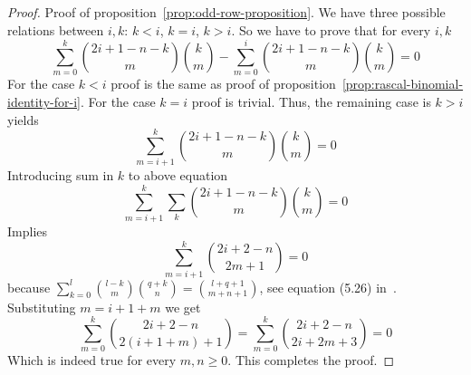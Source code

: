 \begin{proof}
    Proof of proposition~\eqref{prop:odd-row-proposition}.
    We have three possible relations between $i,k$: $k<i$, $k=i$, $k > i$.
    So we have to prove that for every $i,k$
    \begin{equation*}
        \sum_{m=0}^{k} \binom{2i+1-n-k}{m} \binom{k}{m} - \sum_{m=0}^{i} \binom{2i+1-n-k}{m} \binom{k}{m} = 0
    \end{equation*}
    For the case $k<i$ proof is the same as proof of proposition~\eqref{prop:rascal-binomial-identity-for-i}.
    For the case $k=i$ proof is trivial.
    Thus, the remaining case is $k>i$ yields
    \begin{equation*}
        \sum_{m=i+1}^{k} \binom{2i+1-n-k}{m} \binom{k}{m} = 0
    \end{equation*}
    Introducing sum in $k$ to above equation
    \begin{equation*}
        \sum_{m=i+1}^{k} \sum_{k} \binom{2i+1-n-k}{m} \binom{k}{m} = 0
    \end{equation*}
    Implies
    \begin{equation*}
        \sum_{m=i+1}^{k} \binom{2i+2-n}{2m+1} = 0
    \end{equation*}
    because $\sum_{k=0}^{l} \binom{l-k}{m} \binom{q+k}{n} = \binom{l+q+1}{m+n+1}$, see equation (5.26) in~\cite{graham1994concrete}.
    Substituting $m=i+1+m$ we get
    \begin{equation*}
        \sum_{m=0}^{k} \binom{2i+2-n}{2(i+1+m)+1} = \sum_{m=0}^{k} \binom{2i+2-n}{2i+2m+3} = 0
    \end{equation*}
    Which is indeed true for every $m,n \geq 0$.
    This completes the proof.
\end{proof}


